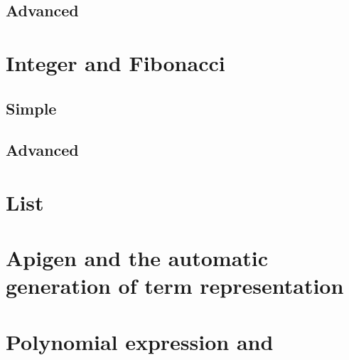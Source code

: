 \subsection{Advanced}

\section{Integer and Fibonacci}
\subsection{Simple}
\subsection{Advanced}

\section{List}

\section{Apigen and the automatic generation of term representation}

\section{Polynomial expression and \TOM}

